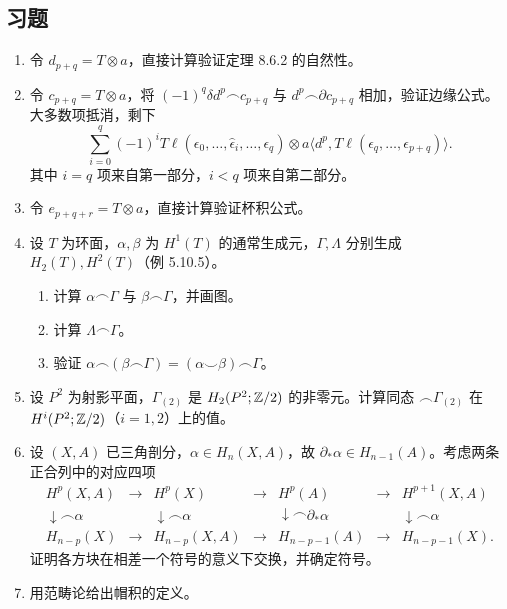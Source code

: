 \subsection*{习题}
\begin{enumerate}
\item 令 $d_{p+q}=T\otimes a$，直接计算验证定理 8.6.2 的自然性。
\item 令 $c_{p+q}=T\otimes a$，将 $(-1)^q\delta d^p\frown c_{p+q}$ 与 $d^p\frown\partial c_{p+q}$ 相加，验证边缘公式。大多数项抵消，剩下
\[
\sum_{i=0}^{q}(-1)^i T\ell(\epsilon_0,\ldots,\widehat\epsilon_i,\ldots,\epsilon_q)
\otimes a\langle d^p,T\ell(\epsilon_q,\ldots,\epsilon_{p+q})\rangle.
\]
其中 $i=q$ 项来自第一部分，$i<q$ 项来自第二部分。
\item 令 $e_{p+q+r}=T\otimes a$，直接计算验证杯积公式。
\item 设 $T$ 为环面，$\alpha,\beta$ 为 $H^1(T)$ 的通常生成元，$\Gamma,\Lambda$ 分别生成 $H_2(T),H^2(T)$（例 5.10.5）。
\begin{enumerate}[label=(\alph*)]
\item 计算 $\alpha\frown\Gamma$ 与 $\beta\frown\Gamma$，并画图。
\item 计算 $\Lambda\frown\Gamma$。
\item 验证 $\alpha\frown(\beta\frown\Gamma)=(\alpha\smile\beta)\frown\Gamma$。
\end{enumerate}
\item 设 $P^2$ 为射影平面，$\Gamma_{(2)}$ 是 $H_2(P^2;\mathbb{Z}/2)$ 的非零元。计算同态 $\frown\Gamma_{(2)}$ 在 $H^i(P^2;\mathbb{Z}/2)$（$i=1,2$）上的值。
\item 设 $(X,A)$ 已三角剖分，$\alpha\in H_n(X,A)$，故 $\partial_*\alpha\in H_{n-1}(A)$。考虑两条正合列中的对应四项
\[
\begin{array}{ccccccc}
H^p(X,A)&\to&H^p(X)&\to&H^p(A)&\to&H^{p+1}(X,A)\\
\downarrow\frown\alpha&&\downarrow\frown\alpha&&\downarrow\frown\partial_*\alpha&&\downarrow\frown\alpha\\
H_{n-p}(X)&\to&H_{n-p}(X,A)&\to&H_{n-p-1}(A)&\to&H_{n-p-1}(X).
\end{array}
\]
证明各方块在相差一个符号的意义下交换，并确定符号。
\item 用范畴论给出帽积的定义。
\end{enumerate}
